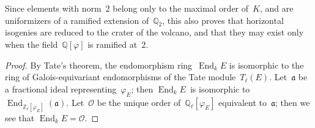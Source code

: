 \documentclass{article}
\let\fr\mathfrak
\let\ro\mathscr
\DeclareMathOperator\End{End}
\newtheorem{prop}{Proposition}
\begin{document}
Since elements with norm~$2$ belong only to the maximal order of~$K$, and
are uniformizers of a ramified extension of~$ℚ_2$, this also proves that
horizontal isogenies are reduced to the crater of the volcano, and that
they may exist only when the field~$ℚ[φ]$ is ramified at~$2$.

\begin{proof}
By Tate's theorem, the endomorphism ring~$\End_k E$ is isomorphic to the
ring of Galois-equivariant endomorphisms of the Tate module~$T_{ℓ}(E)$.
Let~$\fr a$ be a fractional ideal representing~$φ_E$; then $\End_k E$~is
isomorphic to~$\End_{ℤ_{ℓ}[φ_E]} (\fr a)$. Let~$\ro O$ be the unique
order of~$ℚ_{ℓ}[φ_E]$ equivalent to~$\fr a$; then we see that $\End_k E =
\ro O$.
\end{proof}


\end{document}
